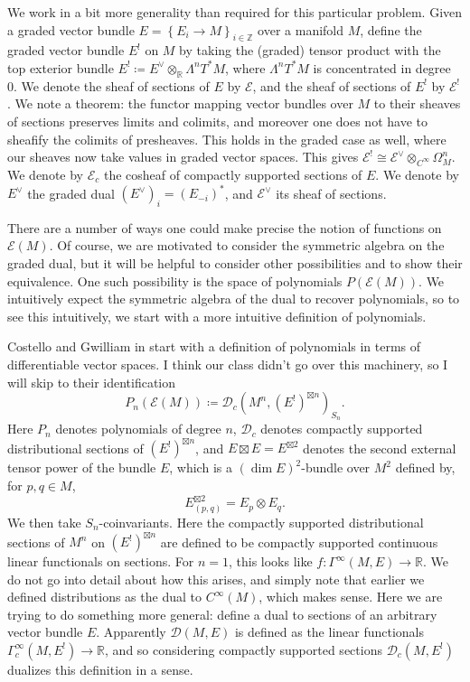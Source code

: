 \begin{example}
We work in a bit more generality than required for this particular problem. Given a graded vector bundle $E = \left\{ E_i \to M \right\}_{i\in\mathbb{Z} } $ over a manifold $M$, define the graded vector bundle $E^!$ on $M$ by taking the (graded) tensor product with the top exterior bundle $E^! \coloneqq E^\vee \otimes_{\mathbb{R}} \Lambda ^nT^*M$, where $\Lambda ^nT^*M$ is concentrated in degree 0. We denote the sheaf of sections of $E$ by $\mathcal{E} $, and the sheaf of sections of $E^!$ by $\mathcal{E} ^!$. We note a theorem: the functor mapping vector bundles over $M$ to their sheaves of sections preserves limits and colimits, and moreover one does not have to sheafify the colimits of presheaves. This holds in the graded case as well, where our sheaves now take values in graded vector spaces. This gives $\mathcal{E} ^! \cong \mathcal{E} ^{\vee } \otimes_{C^\infty} \Omega _M^n$. We denote by $\mathcal{E} _c$ the cosheaf of compactly supported sections of $E$. We denote by $E^\vee $ the graded dual $(E^\vee )_i = (E_{-i} )^*$, and $\mathcal{E} ^\vee $ its sheaf of sections.

There are a number of ways one could make precise the notion of functions on $\mathcal{E} (M)$. Of course, we are motivated to consider the symmetric algebra on the graded dual, but it will be helpful to consider other possibilities and to show their equivalence. One such possibility is the space of polynomials $P(\mathcal{E} (M))$. We intuitively expect the symmetric algebra of the dual to recover polynomials, so to see this intuitively, we start with a more intuitive definition of polynomials.

Costello and Gwilliam in \cite{cg1} start with a definition of polynomials in terms of differentiable vector spaces. I think our class didn't go over this machinery, so I will skip to their identification
\[
	P_n(\mathcal{E} (M)) \coloneqq \mathcal{D} _c\left(M^n , (E^!)^{\boxtimes n}\right)_{S_n}.
\]
Here $P_n$ denotes polynomials of degree $n$, $\mathcal{D} _c$ denotes compactly supported distributional sections of $(E^!)^{\boxtimes n}$, and $E\boxtimes E = E^{\boxtimes 2} $ denotes the second external tensor power of the bundle $E$, which is a $(\dim E)^2$-bundle over $M^2$ defined by, for $p,q\in M$,
\[
	E^{\boxtimes 2}_{(p,q)} =E_p\otimes E_q
.\]
We then take $S_n$-coinvariants. Here the compactly supported distributional sections of $M^n$ on $(E^!)^{\boxtimes n} $ are defined to be compactly supported continuous linear functionals on sections. For $n=1$, this looks like $f : \Gamma ^\infty (M,E) \to \mathbb{R} $. We do not go into detail about how this arises, and simply note that earlier we defined distributions as the dual to $C^\infty (M)$, which makes sense. Here we are trying to do something more general: define a dual to sections of an arbitrary vector bundle $E$. Apparently $\mathcal{D} (M,E)$ is defined as the linear functionals $\Gamma ^\infty _c(M,E^!) \to \mathbb{R} $, and so considering compactly supported sections $\mathcal{D}_c(M,E^!)$ dualizes this definition in a sense.


\end{example}
